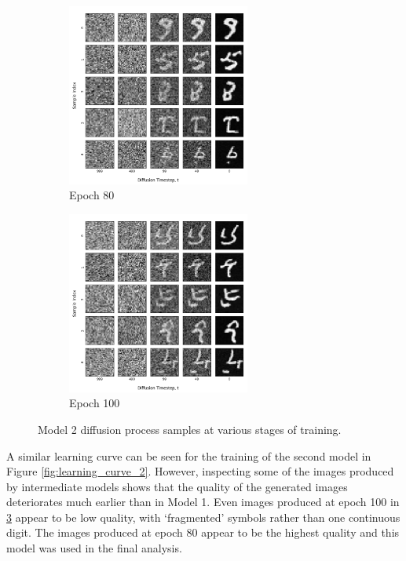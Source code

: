\documentclass[12pt]{article}
\begin{document}
\begin{figure}[hp]
    \begin{subfigure}{0.49\textwidth}
    \includegraphics[width=0.9\linewidth, height=6cm]{figures/diffusion_plot_2_0080.png}
    \caption{Epoch 80}
    \label{fig:2_80}
    \end{subfigure}
    \begin{subfigure}{0.49\textwidth}
    \includegraphics[width=0.9\linewidth, height=6cm]{figures/diffusion_plot_2_0100.png}
    \caption{Epoch 100}
    \label{fig:2_100}
    \end{subfigure}

    \caption{Model 2 diffusion process samples at various stages of training.}
    \label{fig:diffusion_2}
\end{figure}

A similar learning curve can be seen for the training of the second model in Figure \ref{fig:learning_curve_2}.
However, inspecting some of the images produced by intermediate models shows that the quality of the generated images deteriorates much earlier than in Model 1.
Even images produced at epoch 100 in \ref{fig:diffusion_2} appear to be low quality, with `fragmented' symbols rather than one continuous digit.
The images produced at epoch 80 appear to be the highest quality and this model was used in the final analysis.
\end{document}
